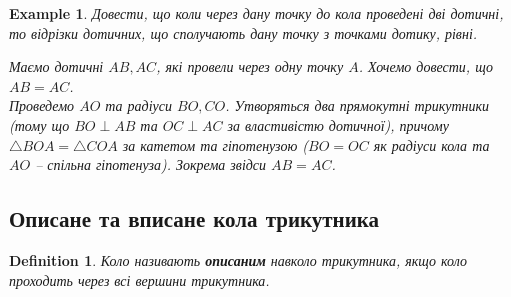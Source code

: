 \documentclass[a4paper, 10pt]{article}
\theoremstyle{theoremdd}
\theoremstyle{theoremdd}
\theoremstyle{theoremdd}
\newtheorem{definition}[theorem]{Definition}
\theoremstyle{theoremdd}
\theoremstyle{theoremdd}
\newtheorem{example}[theorem]{Example}
\theoremstyle{theoremdd}
\theoremstyle{theoremdd}
\theoremstyle{theoremdd}
\theoremstyle{theoremdd}
\begin{document}
\begin{example}
\label{clown_hat}
Довести, що коли через дану точку до кола проведені дві дотичні, то відрізки дотичних, що сполучають дану точку з точками дотику, рівні.
\begin{figure}[H]
\centering
{}
\end{figure}
Маємо дотичні $AB,AC$, які провели через одну точку $A$. Хочемо довести, що $AB = AC$.\\
Проведемо $AO$ та радіуси $BO,CO$. Утворяться два прямокутні трикутники (тому що $BO \perp AB$ та $OC \perp AC$ за властивістю дотичної), причому $\triangle BOA = \triangle COA$ за катетом та гіпотенузою ($BO = OC$ як радіуси кола та $AO$ -- спільна гіпотенуза). Зокрема звідси $AB = AC$.
\end{example}

\subsection{Описане та вписане кола трикутника}
\begin{definition}
Коло називають \textbf{описаним} навколо трикутника, якщо коло проходить через всі вершини трикутника.
\begin{figure}[H]
\centering
{}
\end{figure}
\end{definition}
\end{document}
